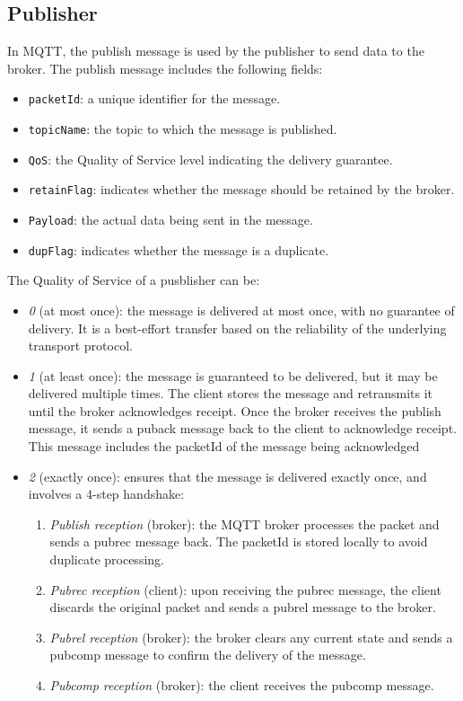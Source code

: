 \subsection{Publisher}
In MQTT, the publish message is used by the publisher to send data to the broker. 
The publish message includes the following fields:
\begin{itemize}
    \item \texttt{packetId}: a unique identifier for the message.
    \item \texttt{topicName}: the topic to which the message is published.
    \item \texttt{QoS}: the Quality of Service level indicating the delivery guarantee.
    \item \texttt{retainFlag}: indicates whether the message should be retained by the broker.
    \item \texttt{Payload}: the actual data being sent in the message.
    \item \texttt{dupFlag}: indicates whether the message is a duplicate.
\end{itemize}
\noindent The Quality of Service of a pusblisher can be: 
\begin{itemize}
    \item \textit{0} (at most once): the message is delivered at most once, with no guarantee of delivery. 
        It is a best-effort transfer based on the reliability of the underlying transport protocol.
    \item \textit{1} (at least once): the message is guaranteed to be delivered, but it may be delivered multiple times. 
        The client stores the message and retransmits it until the broker acknowledges receipt.
        Once the broker receives the publish message, it sends a puback message back to the client to acknowledge receipt. 
        This message includes the packetId of the message being acknowledged

    \item \textit{2} (exactly once): ensures that the message is delivered exactly once, and involves a 4-step handshake:
        \begin{enumerate}
            \item \textit{Publish reception} (broker): the MQTT broker processes the packet and sends a pubrec message back. 
                The packetId is stored locally to avoid duplicate processing.
            \item \textit{Pubrec reception} (client): upon receiving the pubrec message, the client discards the original packet and sends a pubrel message to the broker.
            \item \textit{Pubrel reception} (broker): the broker clears any current state and sends a pubcomp message to confirm the delivery of the message.
            \item \textit{Pubcomp reception} (broker): the client receives the pubcomp message.
        \end{enumerate}
\end{itemize}

